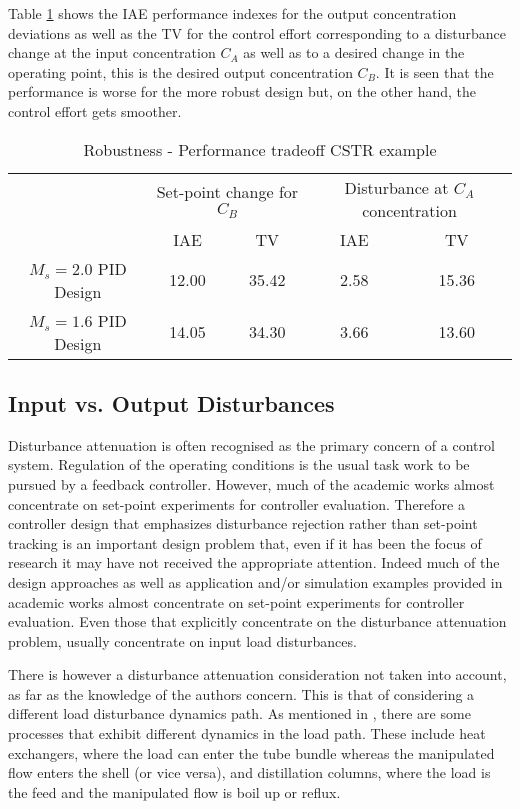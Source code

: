 Table \ref{tab:cstrtradeoff} shows the IAE performance indexes for the output concentration deviations as well as the TV for the control effort corresponding to a disturbance change at the input concentration $C_{A}$ as well as to a desired change in the operating point, this is the desired output concentration $C_B$. It is seen that the performance is worse for the more robust design but, on the other hand, the control effort gets smoother. 
\begin{table}[tb]
	\caption{Robustness - Performance tradeoff CSTR example} \label{tab:cstrtradeoff}
	\centering
    \begin{tabular}{ccccc}
    \toprule
    	 & \multicolumn{2}{c}{Set-point change for $C_B$}  & \multicolumn{2}{c}{Disturbance at $C_A$ concentration}\\
   		 & IAE & TV & IAE & TV\\
    \midrule
    $M_s=2.0$ PID Design   & 12.00 & 35.42 & 2.58 & 15.36 \\
    $M_s=1.6$ PID Design   & 14.05 & 34.30 & 3.66 & 13.60 \\
    \bottomrule
    \end{tabular}
\end{table}

\subsection{Input vs. Output Disturbances}

Disturbance attenuation is often recognised as the primary concern of a control system. Regulation of the operating conditions is the usual task work to be pursued by a feedback controller. However, much of the academic works almost concentrate on set-point experiments for controller evaluation.  Therefore a controller design that emphasizes disturbance rejection rather than set-point tracking is an important design problem that, even if it has been the focus of research it may have not received the appropriate attention. Indeed much of the design approaches as well as application and/or simulation examples provided in academic works almost concentrate on set-point experiments for controller evaluation. Even those that explicitly concentrate on the disturbance attenuation problem, usually concentrate on input load disturbances.

There is however a disturbance attenuation consideration not taken into account, as far as the knowledge of the authors concern. This is that of considering a different load disturbance dynamics path. As mentioned in \cite{Shinskey2002}, there are some processes that exhibit different dynamics in the load path. These include heat exchangers, where the load can enter the tube bundle whereas the manipulated flow enters the shell (or vice versa), and distillation columns, where the load is the feed and the manipulated flow is boil up or reflux.

